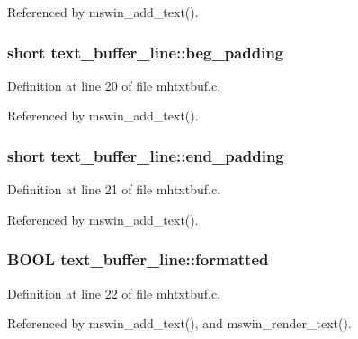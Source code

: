 Referenced by mswin\+\_\+add\+\_\+text().

\hypertarget{structtext__buffer__line_a14587c527cf165fc1f83fee0f32fbc3b}{
\subsubsection[{beg\+\_\+padding}]{\setlength{\rightskip}{0pt plus 5cm}short text\+\_\+buffer\+\_\+line\+::beg\+\_\+padding}}\label{structtext__buffer__line_a14587c527cf165fc1f83fee0f32fbc3b}


Definition at line 20 of file mhtxtbuf.\+c.



Referenced by mswin\+\_\+add\+\_\+text().

\hypertarget{structtext__buffer__line_aacec6fcbbd5dbcbd1b4bee8d9947b6ee}{
\subsubsection[{end\+\_\+padding}]{\setlength{\rightskip}{0pt plus 5cm}short text\+\_\+buffer\+\_\+line\+::end\+\_\+padding}}\label{structtext__buffer__line_aacec6fcbbd5dbcbd1b4bee8d9947b6ee}


Definition at line 21 of file mhtxtbuf.\+c.



Referenced by mswin\+\_\+add\+\_\+text().

\hypertarget{structtext__buffer__line_a954908a09498bbd0349c82db8836b36e}{
\subsubsection[{formatted}]{\setlength{\rightskip}{0pt plus 5cm}B\+O\+O\+L text\+\_\+buffer\+\_\+line\+::formatted}}\label{structtext__buffer__line_a954908a09498bbd0349c82db8836b36e}


Definition at line 22 of file mhtxtbuf.\+c.



Referenced by mswin\+\_\+add\+\_\+text(), and mswin\+\_\+render\+\_\+text().

